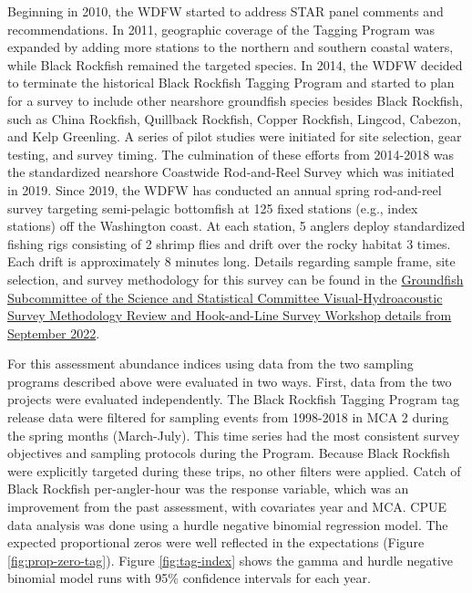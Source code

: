\documentclass[11pt,
  letterpaper,
]{article}
\begin{document}
Beginning in 2010, the WDFW started to address STAR panel comments and recommendations. In 2011, geographic coverage of the Tagging Program was expanded by adding more stations to the northern and southern coastal waters, while Black Rockfish remained the targeted species. In 2014, the WDFW decided to terminate the historical Black Rockfish Tagging Program and started to plan for a survey to include other nearshore groundfish species besides Black Rockfish, such as China Rockfish, Quillback Rockfish, Copper Rockfish, Lingcod, Cabezon, and Kelp Greenling. A series of pilot studies were initiated for site selection, gear testing, and survey timing. The culmination of these efforts from 2014-2018 was the standardized nearshore Coastwide Rod-and-Reel Survey which was initiated in 2019. Since 2019, the WDFW has conducted an annual spring rod-and-reel survey targeting semi-pelagic bottomfish at 125 fixed stations (e.g., index stations) off the Washington coast. At each station, 5 anglers deploy standardized fishing rigs consisting of 2 shrimp flies and drift over the rocky habitat 3 times. Each drift is approximately 8 minutes long. Details regarding sample frame, site selection, and survey methodology for this survey can be found in the \href{https://www.pcouncil.org/documents/2022/10/h-4-a-supplemental-ssc-groundfish-subcommittee-report-2-odfw-video-hydroacoustic-survey-methodology-review-and-wdfw-hook-and-line-survey-workshop-report.pdf/}{Groundfish Subcommittee of the Science and Statistical Committee Visual-Hydroacoustic Survey Methodology Review and Hook-and-Line Survey Workshop details from September 2022}.

For this assessment abundance indices using data from the two sampling programs described above were evaluated in two ways. First, data from the two projects were evaluated independently. The Black Rockfish Tagging Program tag release data were filtered for sampling events from 1998-2018 in MCA 2 during the spring months (March-July). This time series had the most consistent survey objectives and sampling protocols during the Program. Because Black Rockfish were explicitly targeted during these trips, no other filters were applied. Catch of Black Rockfish per-angler-hour was the response variable, which was an improvement from the past assessment, with covariates year and MCA. CPUE data analysis was done using a hurdle negative binomial regression model. The expected proportional zeros were well reflected in the expectations (Figure \ref{fig:prop-zero-tag}). Figure \ref{fig:tag-index} shows the gamma and hurdle negative binomial model runs with 95\% confidence intervals for each year.
\end{document}
